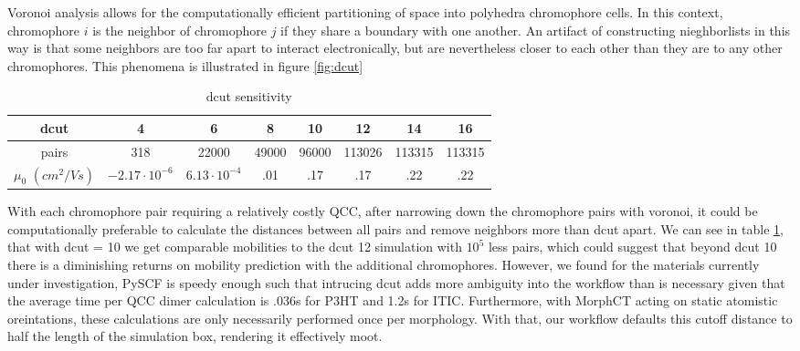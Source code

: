 Voronoi analysis allows for the computationally efficient partitioning of space into
polyhedra chromophore cells. In this context, chromophore $i$ is the neighbor of chromophore $j$ if they
share a boundary with one another. An artifact of constructing nieghborlists in this way is that some
neighbors are too far apart to interact electronically, but are nevertheless closer to each other than they
are to any other chromophores. 
This phenomena is illustrated in figure \ref{fig:dcut} 

\begin{table}[ht]
\caption{dcut sensitivity}
\centering %
\begin{tabular}{c c c c c c c c} %
\hline\hline %
dcut & 4 & 6 & 8 & 10 & 12 & 14 & 16 \\ [0.5ex] %
\hline  %
pairs & 318 & 22000 & 49000 & 96000 & 113026 & 113315 & 113315 \\ [1ex]%
$\mu_{0}$ $(cm^{2}/Vs)$ & $-2.17 \cdot 10^{-6}$ & $6.13 \cdot 10^{-4}$ & .01 & .17 & .17 & .22 & .22 \\ [1ex] %
\hline %
\end{tabular}
\label{table:dcut-sense} %
\end{table}


With each chromophore pair requiring a relatively costly QCC, after narrowing down the chromophore pairs with voronoi, it
could be
computationally preferable to calculate the distances between all pairs and remove neighbors more than dcut
apart. We can see in table \ref{table:dcut-sense}, that with dcut = 10 we get comparable mobilities to the
dcut 12 simulation with $10^5$ less
pairs, which could suggest that beyond dcut 10 there is a diminishing returns on mobility prediction with the
additional chromophores. However, we found for the materials currently under investigation, PySCF is speedy enough such that intrucing dcut adds more ambiguity
into the workflow than is necessary given that the average time per QCC dimer calculation is .036s for P3HT and
1.2s for ITIC. Furthermore, with MorphCT acting on static atomistic oreintations, these calculations 
are only necessarily performed once per morphology. With that, our workflow defaults this cutoff distance to half
the length of the simulation box, rendering it effectively moot. 

